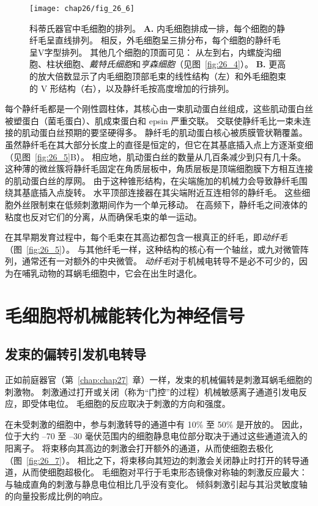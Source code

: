 \begin{figure}[htbp]
	\centering
	\texttt{[image: chap26/fig\_26\_6]}
	\caption{科蒂氏器官中毛细胞的排列。
		\textbf{A.} 内毛细胞排成一排，每个细胞的静纤毛呈直线排列。 
		相反，外毛细胞呈三排分布，每个细胞的静纤毛呈V字型排列。 
		其他几个细胞的顶面可见：
		从左到右，内螺旋沟细胞、柱状细胞、\textit{戴特氏细胞}和\textit{亨森细胞}（见图~\ref{fig:26_4}）。
		\textbf{B.} 更高的放大倍数显示了内毛细胞顶部毛束的线性结构（左）和外毛细胞束的 V 形结构（右），以及静纤毛按高度增加的行排列。}
	\label{fig:26_6}
\end{figure}


每个静纤毛都是一个刚性圆柱体，其核心由一束肌动蛋白丝组成，这些肌动蛋白丝被塑蛋白（菌毛蛋白）、肌成束蛋白和 epsin 严重交联。
交联使静纤毛比一束未连接的肌动蛋白丝预期的要坚硬得多。
静纤毛的肌动蛋白核心被质膜管状鞘覆盖。
虽然静纤毛在其大部分长度上的直径是恒定的，但它在其基底插入点上方逐渐变细（见图~\ref{fig:26_5}B）。
相应地，肌动蛋白丝的数量从几百条减少到只有几十条。 
这种薄的微丝簇将静纤毛固定在角质层板中，角质层板是顶端细胞膜下方相互连接的肌动蛋白丝的厚网。
由于这种锥形结构，在尖端施加的机械力会导致静纤毛围绕其基底插入点旋转。
水平顶部连接器在其尖端附近互连相邻的静纤毛。
这些细胞外丝限制束在低频刺激期间作为一个单元移动。 
在高频下，静纤毛之间液体的粘度也反对它们的分离，从而确保毛束的单一运动。


在其早期发育过程中，每个毛束在其高边都包含一根真正的纤毛，即\textit{动纤毛}（图~\ref{fig:26_5}）。 
与其他纤毛一样，这种结构的核心有一个轴丝，或九对微管阵列，通常还有一对额外的中央微管。
\textit{动纤毛}对于机械电转导不是必不可少的，因为在哺乳动物的耳蜗毛细胞中，它会在出生时退化。



\section{毛细胞将机械能转化为神经信号}

\subsection{发束的偏转引发机电转导}

正如前庭器官（第~\ref{chap:chap27}~章）一样，发束的机械偏转是刺激耳蜗毛细胞的刺激物。
刺激通过打开或关闭（称为“门控”的过程）机械敏感离子通道引发电反应，即受体电位。
毛细胞的反应取决于刺激的方向和强度。


在未受刺激的细胞中，参与刺激转导的通道中有 10\% 至 50\% 是开放的。
因此，位于大约 –70 至 –30 毫伏范围内的细胞静息电位部分取决于通过这些通道流入的阳离子。
将束移向其高边的刺激会打开额外的通道，从而使细胞去极化（图~\ref{fig:26_7}）。
相比之下，将束移向其短边的刺激会关闭静止时打开的转导通道，从而使细胞超极化。
毛细胞对平行于毛束形态镜像对称轴的刺激反应最大：
与轴成直角的刺激与静息电位相比几乎没有变化。
倾斜刺激引起与其沿灵敏度轴的向量投影成比例的响应。


